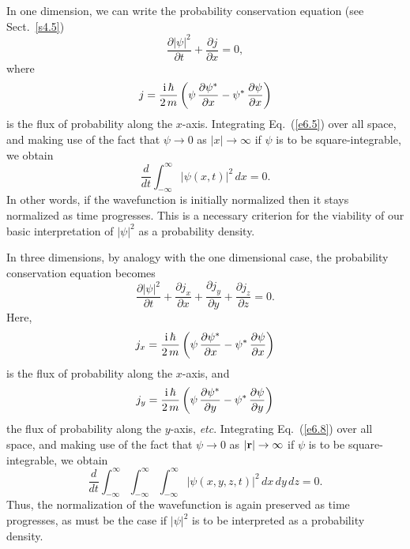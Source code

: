 In one dimension, we can write the probability conservation equation (see
Sect.~\ref{s4.5})
\begin{equation}\label{e6.5}
\frac{\partial|\psi|^2}{\partial t} + \frac{\partial j}{\partial x} = 0,
\end{equation}
where
\begin{equation}
j  = \frac{{\rm i}\,\hbar}{2\,m}\left(\psi\,\frac{\partial\psi^\ast}{\partial x} - \psi^\ast\,\frac{\partial\psi}{\partial x}\right)
\end{equation}
is the flux of probability along the $x$-axis. Integrating 
Eq.~(\ref{e6.5}) over all space, and making use of the fact that $\psi\rightarrow 0$
as $|x|\rightarrow\infty$ if $\psi$ is to be square-integrable, we obtain
\begin{equation}
\frac{d}{dt}\int_{-\infty}^{\infty} |\psi(x,t)|^2\,dx = 0.
\end{equation}
In other words, if the wavefunction  is initially normalized then it stays
normalized as time progresses. This is a necessary criterion for the viability of our basic
interpretation of $|\psi|^2$ as a probability density.

In three dimensions, by analogy with the one dimensional case, the probability conservation equation becomes
\begin{equation}\label{e6.8}
\frac{\partial|\psi|^2}{\partial t} + \frac{\partial j_x}{\partial x} + \frac{\partial j_y}{\partial y} + \frac{\partial j_z}{\partial z}= 0.
\end{equation}
Here,
\begin{equation}
j_{x} =\frac{{\rm i}\,\hbar}{2\,m}\left(\psi\,\frac{\partial\psi^\ast}{\partial x} - \psi^\ast\,\frac{\partial\psi}{\partial x}\right)
\end{equation}
is the flux of probability along the $x$-axis, and
\begin{equation}
j_{y} =\frac{{\rm i}\,\hbar}{2\,m}\left(\psi\,\frac{\partial\psi^\ast}{\partial y} - \psi^\ast\,\frac{\partial\psi}{\partial y}\right)
\end{equation}
 the flux of probability along the $y$-axis, {\em etc}.
Integrating 
Eq.~(\ref{e6.8}) over all space, and making use of the fact that $\psi\rightarrow 0$
as $|{\bf r}|\rightarrow\infty$ if $\psi$ is to be square-integrable, we obtain
\begin{equation}
\frac{d}{dt}\int_{-\infty}^{\infty}\int_{-\infty}^{\infty}\int_{-\infty}^{\infty} |\psi(x,y,z,t)|^2\,dx\,dy\,dz = 0.
\end{equation}
Thus, the normalization of the wavefunction is again preserved as time
progresses, as must be the case if $|\psi|^2$ is to be interpreted as a
probability density.

